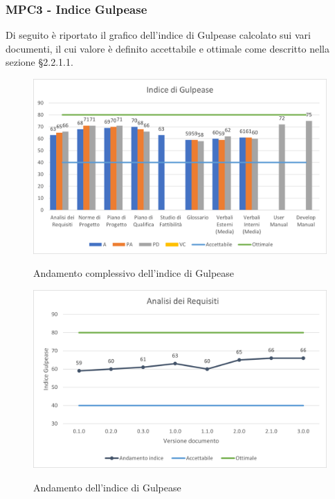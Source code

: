 \subsubsection{MPC3 - Indice Gulpease}
Di seguito è riportato il grafico dell'indice di Gulpease calcolato sui vari documenti, il cui valore è definito accettabile e ottimale come descritto nella sezione §2.2.1.1.\\


\begin{figure}[H]
\centering
\includegraphics[scale=0.78]{res/ResocontoAttivitaDiVerifica/res/metriche/grafici/img/indiceGulpease.png}\\
\caption{Andamento complessivo dell'indice di Gulpease}
\end{figure}


\begin{figure}[H]
\centering
\includegraphics[scale=0.78]{res/ResocontoAttivitaDiVerifica/res/metriche/grafici/img/gulpeaseADR.png}\\
\caption{Andamento dell'indice di Gulpease \AdR}
\end{figure}

